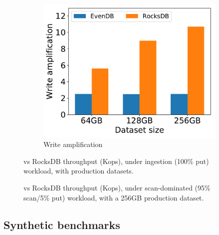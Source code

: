 \begin{figure}[tb]
\begin{subfigure}{0.33\linewidth}
\includegraphics[width=\textwidth]{figs/write_amp_256.pdf}
\caption{Write amplification}
\label{fig:prod:ingestion:c}
\end{subfigure}
\caption{\sys\/ vs RocksDB throughput (Kops), under ingestion (100\% put) workload, with production datasets.}
\label{fig:prod:ingestion}
\end{figure}

\begin{figure}[tb]
\caption{\sys\/ vs RocksDB throughput (Kops),  under scan-dominated (95\% scan/5\% put) workload, 
with a 256GB production dataset.}
\label{fig:prod:analytics}
\end{figure}

\subsection{Synthetic benchmarks}
\label{ssec:synthetic} 

